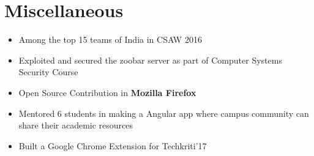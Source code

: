 \section*{\sc Miscellaneous}
\vspace{-2mm}
\hrulefill
\vspace{2mm}

\begin{itemize}
 \item Among the top 15 teams of India in CSAW 2016
 \item Exploited and secured the zoobar server as part of Computer Systems Security Course
 \item Open Source Contribution in \textbf{Mozilla Firefox}
 \item Mentored 6 students in making a Angular app where campus community can
   share their academic resources
 \item Built a Google Chrome Extension for Techkriti'17
\end{itemize}